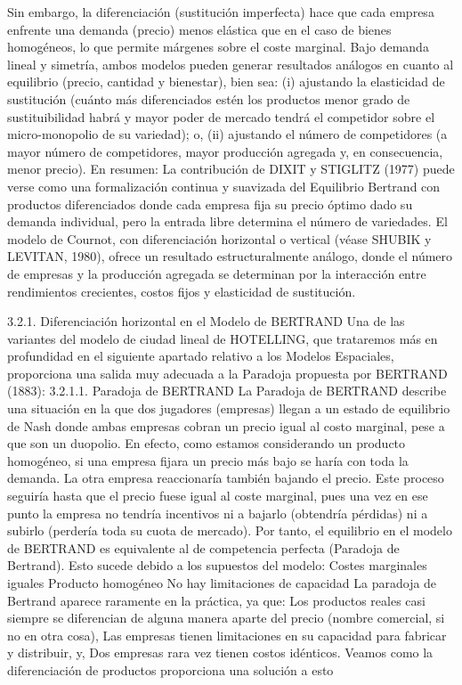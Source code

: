 \documentclass[10pt,a4paper]{article}
\begin{document}
Sin embargo, la diferenciación (sustitución imperfecta) hace que cada empresa enfrente una demanda (precio) menos elástica que en el caso de bienes homogéneos, lo que permite márgenes sobre el coste marginal. 
Bajo demanda lineal y simetría, ambos modelos pueden generar resultados análogos en cuanto al equilibrio (precio, cantidad y bienestar), bien sea: (i) ajustando la elasticidad de sustitución (cuánto más diferenciados estén los productos menor grado de sustituibilidad habrá y mayor poder de mercado tendrá el competidor sobre el micro-monopolio de su variedad); o, (ii) ajustando el número de competidores (a mayor número de competidores, mayor producción agregada y, en consecuencia, menor precio).
En resumen:
	La contribución de DIXIT y STIGLITZ (1977) puede verse como una formalización continua y suavizada del Equilibrio Bertrand con productos diferenciados donde cada empresa fija su precio óptimo dado su demanda individual, pero la entrada libre determina el número de variedades.
	El modelo de Cournot, con diferenciación horizontal o vertical (véase SHUBIK y LEVITAN, 1980), ofrece un resultado estructuralmente análogo, donde el número de empresas y la producción agregada se determinan por la interacción entre rendimientos crecientes, costos fijos y elasticidad de sustitución.

3.2.1. Diferenciación horizontal en el Modelo de BERTRAND
Una de las variantes del modelo de ciudad lineal de HOTELLING, que trataremos más en profundidad en el siguiente apartado relativo a los Modelos Espaciales, proporciona una salida muy adecuada a la Paradoja propuesta por BERTRAND (1883):
3.2.1.1. Paradoja de BERTRAND
La Paradoja de BERTRAND describe una situación en la que dos jugadores (empresas) llegan a un estado de equilibrio de Nash donde ambas empresas cobran un precio igual al costo marginal, pese a que son un duopolio.  
En efecto, como estamos considerando un producto homogéneo, si una empresa fijara un precio más bajo se haría con toda la demanda. La otra empresa reaccionaría también bajando el precio. Este proceso seguiría hasta que el precio fuese igual al coste marginal, pues una vez en ese punto la empresa no tendría incentivos ni a bajarlo (obtendría pérdidas) ni a subirlo (perdería toda su cuota de mercado). Por tanto, el equilibrio en el modelo de BERTRAND es equivalente al de competencia perfecta (Paradoja de Bertrand). Esto sucede debido a los supuestos del modelo:
	Costes marginales iguales
	Producto homogéneo
	No hay limitaciones de capacidad
La paradoja de Bertrand aparece raramente en la práctica, ya que:
	Los productos reales casi siempre se diferencian de alguna manera aparte del precio (nombre comercial, si no en otra cosa), 
	Las empresas tienen limitaciones en su capacidad para fabricar y distribuir, y, 
	Dos empresas rara vez tienen costos idénticos.
Veamos como la diferenciación de productos proporciona una solución a esto
\end{document}
